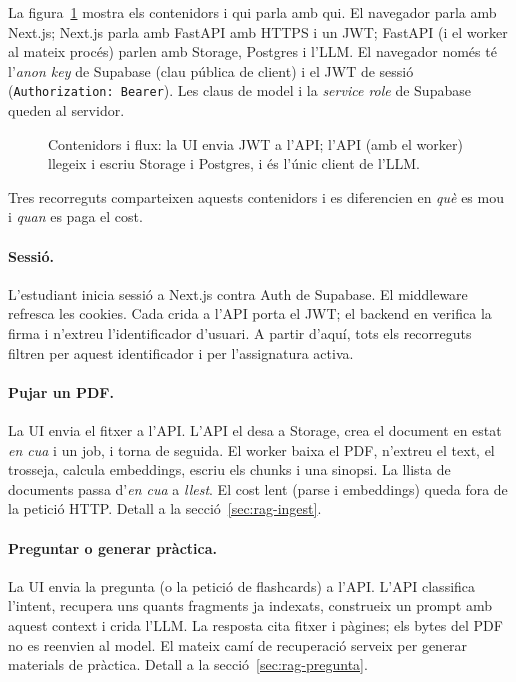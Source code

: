 La figura~\ref{fig:flux} mostra els contenidors i qui parla amb qui. El navegador parla amb Next.js; Next.js parla amb FastAPI amb HTTPS i un JWT; FastAPI (i el worker al mateix procés) parlen amb Storage, Postgres i l'LLM. El navegador només té l'\emph{anon key} de Supabase (clau pública de client) i el JWT de sessió (\texttt{Authorization: Bearer}). Les claus de model i la \emph{service role} de Supabase queden al servidor.

\begin{figure}[htbp]
\centering

\caption{Contenidors i flux: la UI envia JWT a l'API; l'API (amb el worker) llegeix i escriu Storage i Postgres, i és l'únic client de l'LLM.}
\label{fig:flux}
\end{figure}

Tres recorreguts comparteixen aquests contenidors i es diferencien en \emph{què} es mou i \emph{quan} es paga el cost.

\paragraph{Sessió.}
L'estudiant inicia sessió a Next.js contra Auth de Supabase. El middleware refresca les cookies. Cada crida a l'API porta el JWT; el backend en verifica la firma i n'extreu l'identificador d'usuari. A partir d'aquí, tots els recorreguts filtren per aquest identificador i per l'assignatura activa.

\paragraph{Pujar un PDF.}
La UI envia el fitxer a l'API. L'API el desa a Storage, crea el document en estat \emph{en cua} i un job, i torna de seguida. El worker baixa el PDF, n'extreu el text, el trosseja, calcula embeddings, escriu els chunks i una sinopsi. La llista de documents passa d'\emph{en cua} a \emph{llest}. El cost lent (parse i embeddings) queda fora de la petició HTTP. Detall a la secció~\ref{sec:rag-ingest}.

\paragraph{Preguntar o generar pràctica.}
La UI envia la pregunta (o la petició de flashcards) a l'API. L'API classifica l'intent, recupera uns quants fragments ja indexats, construeix un prompt amb aquest context i crida l'LLM. La resposta cita fitxer i pàgines; els bytes del PDF no es reenvien al model. El mateix camí de recuperació serveix per generar materials de pràctica. Detall a la secció~\ref{sec:rag-pregunta}.

